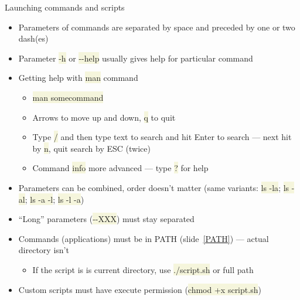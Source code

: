 \documentclass[compress, ucs, xelatex, 11pt, xcolor=svgnames, aspectratio=169,
	hyperref={
		bookmarks=true,
		unicode=true,
		colorlinks=true,
		pdftitle={Linux, command line and MetaCentrum},
		plainpages=false,
		pdfauthor={Vojtech Zeisek},
		pdfsubject={Course about use of Linux command line, writing shell scripts and using MetaCentrum of CESNET},
		pdfcreator={XeLaTeX},
		pdfkeywords={Linux, GNU, BASH, shell, command line, MetaCentrum},
		linkcolor=DarkRed, %
		anchorcolor=DarkBlue, %
		citecolor=Indigo, %
		filecolor=NavyBlue, %
		menucolor=DarkMagenta, %
		urlcolor=DarkBlue, %
		pdftex},
	url={hyphens, lowtilde} %
	]{beamer}
\renewcommand{\texttt}[1]{\colorbox{Beige}{{\ttfamily #1}}}
\begin{document}
\begin{frame}{Launching commands and scripts}
	\begin{itemize}
		\item Parameters of commands are separated by space and preceded by one or two dash(es)
		\item Parameter \texttt{-h} or \texttt{-{-}help} usually gives help for particular command
		\item Getting help with \texttt{man} command
		\begin{itemize}
			\item \texttt{man somecommand}
			\item Arrows to move up and down, \texttt{q} to quit
			\item Type \texttt{/} and then type text to search and hit Enter to search --- next hit by \texttt{n}, quit search by ESC (twice)
			\item Command \texttt{info} more advanced --- type \texttt{?} for help
		\end{itemize}
		\item Parameters can be combined, order doesn't matter (same variants: \texttt{ls -la}; \texttt{ls -al}; \texttt{ls -a -l}; \texttt{ls -l -a})
		\item \enquote{Long} parameters (\texttt{-{-}XXX}) must stay separated
		\item Commands (applications) must be in PATH (slide~\ref{PATH}) --- actual directory isn't
		\begin{itemize}
			\item If the script is is current directory, use \texttt{./script.sh} or full path
		\end{itemize}
		\item Custom scripts must have execute permission (\texttt{chmod +x script.sh})
	\end{itemize}
\end{frame}
\end{document}
